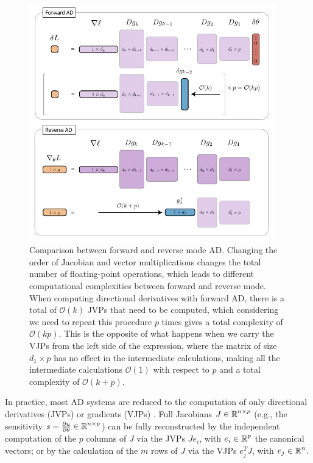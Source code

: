 \begin{figure}[p]
    \centering
    \includegraphics[width=0.95\textwidth]{figures/AD-VJPJVP.pdf}
    \caption{Comparison between forward and reverse mode AD. Changing the order of Jacobian and vector multiplications changes the total number of floating-point operations, which leads to different computational complexities between forward and reverse mode. When computing directional derivatives with forward AD, there is a total of $\mathcal O (k)$ JVPs that need to be computed, which considering we need to repeat this procedure $p$ times gives a total complexity of $\mathcal O (kp)$. This is the opposite of what happens when we carry the VJPs from the left side of the expression, where the matrix of size $d_1 \times p$ has no effect in the intermediate calculations, making all the intermediate calculations $\mathcal O (1)$ with respect to $p$ and a total complexity of $\mathcal O (k + p)$. }
    \label{fig:vjp-jvp}
\end{figure}

In practice, most AD systems are reduced to the computation of only directional derivatives (JVPs) or gradients (VJPs) \cite{Griewank:2008kh}.
Full Jacobians $J \in \operatorname{\mathbb{R}}^{n \times p}$ (e.g., the sensitivity $s = \frac{\partial u}{\partial \theta} \in \operatorname{\mathbb{R}}^{n \times p}$) can be fully reconstructed by the independent computation of the $p$ columns of $J$ via the JVPs $J e_i$, with $e_i \in \operatorname{\mathbb{R}}^p$ the canonical vectors; or by the calculation of the $m$ rows of $J$ via the VJPs $e_j^T J$, with $e_j \in \operatorname{\mathbb{R}}^n$.

